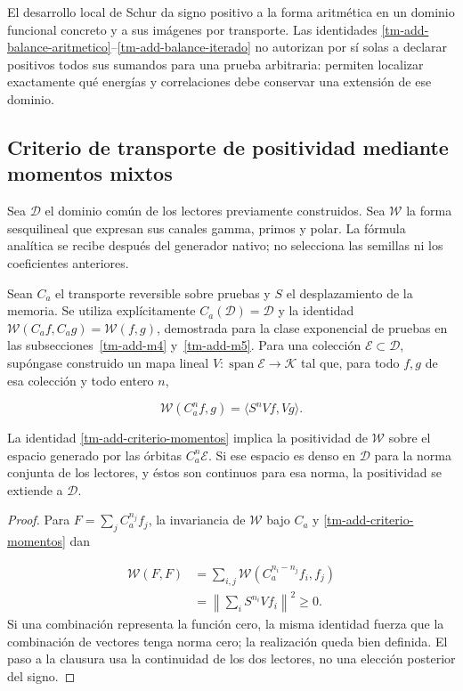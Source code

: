 El desarrollo local de Schur da signo positivo a la forma aritmética en un dominio funcional concreto y a sus imágenes por transporte. Las identidades \eqref{tm-add-balance-aritmetico}–\eqref{tm-add-balance-iterado} no autorizan por sí solas a declarar positivos todos sus sumandos para una prueba arbitraria: permiten localizar exactamente qué energías y correlaciones debe conservar una extensión de ese dominio.


\subsection{Criterio de transporte de positividad mediante momentos mixtos}
\label{tm-add-c5}
Sea \(\mathcal D\) el dominio común de los lectores previamente construidos. Sea \(\mathscr W\) la forma sesquilineal que expresan sus canales gamma, primos y polar. La fórmula analítica se recibe después del generador nativo; no selecciona las semillas ni los coeficientes anteriores.

Sean \(C_a\) el transporte reversible sobre pruebas y \(S\) el desplazamiento de la memoria. Se utiliza explícitamente \(C_a(\mathcal D)=\mathcal D\) y la identidad \(\mathscr W(C_af,C_ag)=\mathscr W(f,g)\), demostrada para la clase exponencial de pruebas en las subsecciones~\ref{tm-add-m4} y~\ref{tm-add-m5}. Para una colección \(\mathcal E\subset\mathcal D\), supóngase construido un mapa lineal \(V:\operatorname{span}\mathcal E\to\mathcal K\) tal que, para todo \(f,g\) de esa colección y todo entero \(n\),

\begin{equation}
\boxed{\mathscr W(C_a^n f,g)=\langle S^nVf,Vg\rangle.}
\label{tm-add-criterio-momentos}
\end{equation}
\begin{proposition}
\label{tm-add-proposicion-costura-3}
La identidad \eqref{tm-add-criterio-momentos} implica la positividad de \(\mathscr W\) sobre el espacio generado por las órbitas \(C_a^n\mathcal E\). Si ese espacio es denso en \(\mathcal D\) para la norma conjunta de los lectores, y éstos son continuos para esa norma, la positividad se extiende a \(\mathcal D\).
\end{proposition}

\begin{proof}
Para \(F=\sum_j C_a^{n_j}f_j\), la invariancia de \(\mathscr W\) bajo \(C_a\) y \eqref{tm-add-criterio-momentos} dan

\[
\begin{aligned}
\mathscr W(F,F)
&=\sum_{i,j}\mathscr W(C_a^{n_i-n_j}f_i,f_j)\\
&=\left\|\sum_i S^{n_i}Vf_i\right\|^2\geq0.
\end{aligned}
\]
Si una combinación representa la función cero, la misma identidad fuerza que la combinación de vectores tenga norma cero; la realización queda bien definida. El paso a la clausura usa la continuidad de los dos lectores, no una elección posterior del signo.
\end{proof}

